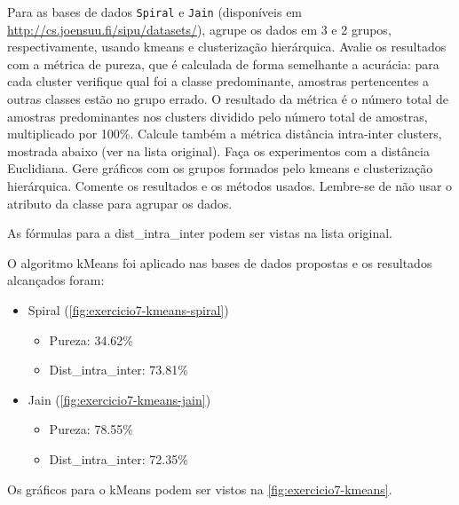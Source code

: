 \documentclass{article}
\begin{document}
Para as bases de dados \texttt{Spiral} e \texttt{Jain} (disponíveis em \url{http://cs.joensuu.fi/sipu/datasets/}), agrupe os dados em 3 e 2 grupos, respectivamente, usando kmeans e clusterização hierárquica. Avalie os resultados com a métrica de pureza, que é calculada de forma semelhante a acurácia: para cada cluster verifique qual foi a classe predominante, amostras pertencentes a outras classes estão no grupo errado. O resultado da métrica é o número total de amostras predominantes nos clusters dividido pelo número total de amostras, multiplicado por 100\%. Calcule também a métrica distância intra-inter clusters, mostrada abaixo (ver na lista original). Faça os experimentos com a distância Euclidiana. Gere gráficos com os grupos formados pelo kmeans e clusterização hierárquica. Comente os resultados e os métodos usados. Lembre-se de não usar o atributo da classe para agrupar os dados.

As fórmulas para a dist\_intra\_inter podem ser vistas na lista original.

O algoritmo kMeans foi aplicado nas bases de dados propostas e os resultados alcançados foram:

\begin{itemize}
	\item Spiral (\autoref{fig:exercicio7-kmeans-spiral})
	\begin{itemize}
		\item Pureza: 34.62\%
		\item Dist\_intra\_inter: 73.81\%
	\end{itemize}
	\item Jain (\autoref{fig:exercicio7-kmeans-jain})
	\begin{itemize}
		\item Pureza: 78.55\%
		\item Dist\_intra\_inter: 72.35\%
	\end{itemize}
\end{itemize}

Os gráficos para o kMeans podem ser vistos na \autoref{fig:exercicio7-kmeans}.
\end{document}
